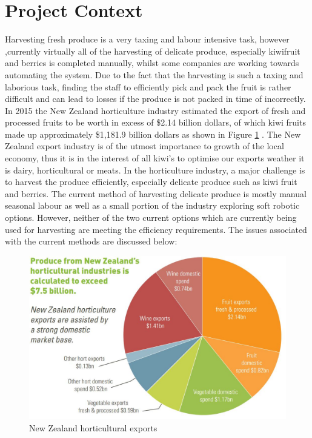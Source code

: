 \documentclass[11pt]{article}
\begin{document}
\section{Project Context}
Harvesting fresh produce is a very taxing and labour intensive task, however ,currently virtually all of the harvesting of delicate produce, especially kiwifruit and berries is completed manually, whilst some companies are working towards automating the system. Due to the fact that the harvesting is such a taxing and laborious task, finding the staff to efficiently pick and pack the fruit is rather difficult and can lead to losses if the produce is not packed in time of incorrectly. In 2015 the New Zealand horticulture industry estimated the export of fresh and processed fruits to be worth in excess of \$2.14 billion dollars, of which kiwi fruits made up approximately \$1,181.9 billion dollars as shown in Figure \ref{fig:Pie} \cite{fresh_facts_2015}. The New Zealand export industry is of the utmost importance to growth of the local economy, thus it is in the interest of all kiwi's to optimise our exports weather it is dairy, horticultural or meats. In the horticulture industry, a major challenge is to harvest the produce efficiently, especially delicate produce such as kiwi fruit and berries. The current method of harvesting delicate produce is mostly manual seasonal labour as well as a small portion of the industry exploring soft robotic options. However, neither of the two current options which are currently being used for harvesting are meeting the efficiency requirements. The issues associated with the current methods are discussed below:
\begin{figure}[h]
\centering
\includegraphics[scale=0.45]{pie_imports}
\caption{New Zealand horticultural exports}
\label{fig:Pie}
\end{figure}
\end{document}
